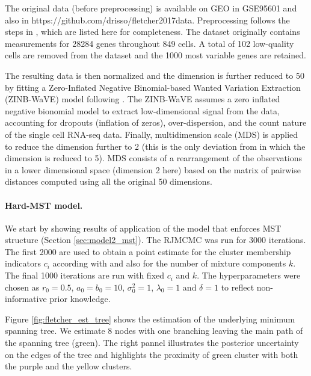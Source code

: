 The original data (before preprocessing) is available on GEO in
GSE95601 and also in
https://github.com/drisso/fletcher2017data. Preprocessing follows the steps in \citep{perraudeau2017}, which are listed here for completeness. The dataset originally contains measurements for 28284 genes throughout 849 cells. A total of 102 low-quality cells are removed from the dataset and the 1000 most variable genes are retained.

The resulting data is then normalized and the dimension is further
reduced to 50 by fitting a Zero-Inflated Negative Binomial-based Wanted Variation Extraction (ZINB-WaVE) model following \cite{zinbwave}. The ZINB-WaVE assumes a zero inflated negative bionomial model to extract low-dimensional signal from the data, accounting for dropouts (inflation of zeros), over-dispersion, and the count nature of the single cell RNA-seq data. Finally, multidimension scale (MDS) \citep{mardia1979} is applied to reduce the dimension further to 2 (this is the only deviation from \citealt{perraudeau2017} in which the dimension is reduced to 5). MDS consists of a rearrangement of the observations in a lower dimensional space (dimension 2 here) based on the matrix of pairwise distances computed using all the original 50 dimensions.

\paragraph*{Hard-MST model.}
We start by showing results of application of the model that enforces
MST structure (Section \ref{sec:model2_mst}). The RJMCMC was run for
3000 iterations. The first 2000 are used to obtain a point
estimate for the cluster membership indicators $c_i$ according with
\cite{dahl2006} and also for the number of mixture components
$k$. The final 1000 iterations are run with fixed $c_i$ and $k$.
The hyperparameters were chosen as $r_0 = 0.5$, $a_0=b_0=10$,
$\sigma^2_0=1$, $\lambda_0=1$ and $\delta=1$ to reflect
non-informative prior knowledge.


Figure \ref{fig:fletcher_est_tree} shows the estimation of the underlying minimum spanning tree. We estimate 8 nodes with one branching leaving the main path of the spanning tree (green). The right pannel illustrates the posterior uncertainty on the edges of the tree and highlights the proximity of green cluster with both the purple and the yellow clusters.


